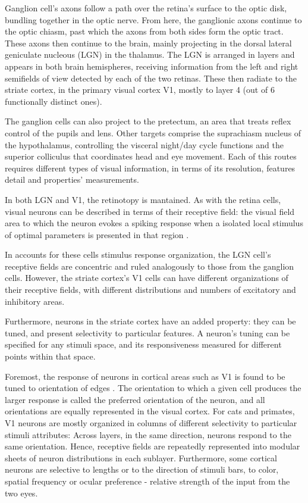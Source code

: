 Ganglion cell's axons follow a path over the retina's surface to the optic disk, bundling together in the optic nerve. %
From here, the ganglionic axons continue to the optic chiasm, past which the axons from both sides form the optic tract. These axons then continue to the brain, mainly projecting in the dorsal lateral geniculate nucleous (LGN) in the thalamus. The LGN is arranged in layers and appears in both brain hemispheres,  receiving information from the left and right semifields of view detected by each of the two retinas. These then radiate to the striate cortex, in the primary visual cortex V1, mostly to layer 4 (out of 6 functionally distinct ones).

The ganglion cells can also project to the pretectum, an area that treats reflex control of the pupils and lens. Other targets comprise the suprachiasm nucleus of the hypothalamus, controlling the visceral night/day cycle functions and the superior colliculus that coordinates head and eye movement. Each of this routes requires different types of visual information, in terms of its resolution, features detail and properties' measurements. 

In both LGN and V1, the retinotopy is mantained.
As with the retina cells, visual neurons can be described in terms of their receptive field: the visual field area to which the neuron evokes a spiking response when a isolated local stimulus of optimal parameters is presented in that region \cite{Hubel1959}.

In accounts for these cells stimulus response organization, the LGN cell's receptive fields are concentric and ruled analogously to those from the ganglion cells. 
However, the striate cortex's V1 cells can have different organizations of their receptive fields, with different distributions and numbers of excitatory and inhibitory areas. 

Furthermore, neurons in the striate cortex have an added property: they can be tuned, and present selectivity to particular features. A neuron's tuning can be specified for any stimuli space, and its responsiveness measured for different points within that space. 

Foremost, the response of neurons in cortical areas such as V1 is found to be tuned to orientation of edges \cite{Hubel1959}. The orientation to which a given cell produces the larger response is called the preferred orientation of the neuron, and all orientations are equally represented in the visual cortex. For cats and primates, V1 neurons are mostly organized in columns of different selectivity to particular stimuli attributes: Across layers, in the same direction, neurons respond to the same orientation. Hence, receptive fields are repeatedly represented into modular sheets of neuron distributions in each sublayer. Furthermore, some cortical neurons are selective to lengths or to the direction of stimuli bars, to color, spatial frequency or ocular preference - relative strength of the input from the two eyes. 

